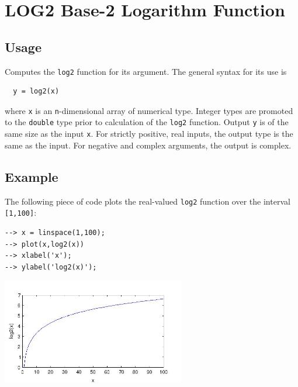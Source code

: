 \section{LOG2 Base-2 Logarithm Function}

\subsection{Usage}

Computes the \verb|log2| function for its argument.  The general
syntax for its use is
\begin{verbatim}
  y = log2(x)
\end{verbatim}
where \verb|x| is an \verb|n|-dimensional array of numerical type.
Integer types are promoted to the \verb|double| type prior to
calculation of the \verb|log2| function.  Output \verb|y| is of the
same size as the input \verb|x|. For strictly positive, real inputs, 
the output type is the same as the input.
For negative and complex arguments, the output is complex.
\subsection{Example}

The following piece of code plots the real-valued \verb|log2|
function over the interval \verb|[1,100]|:
\begin{verbatim}
--> x = linspace(1,100);
--> plot(x,log2(x))
--> xlabel('x');
--> ylabel('log2(x)');
\end{verbatim}


\centerline{\includegraphics[width=8cm]{log2plot}}

